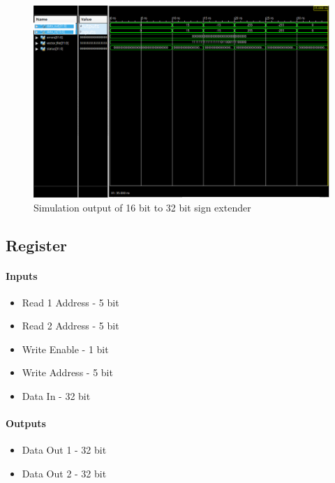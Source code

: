 \documentclass{article}
\begin{document}
    \begin{figure}[H]
        \centering
        \includegraphics[width=0.9\paperwidth,center]{Screenshots/sign_extend.png}
        \caption{Simulation output of 16 bit to 32 bit sign extender}
    \end{figure}




    \subsection{Register}

    \paragraph{Inputs}
    \begin{itemize}
        \item Read 1 Address - 5 bit
        \item Read 2 Address - 5 bit
        \item Write Enable - 1 bit
        \item Write Address - 5 bit
        \item Data In - 32 bit
    \end{itemize}

    \paragraph{Outputs}
    \begin{itemize}
        \item Data Out 1 - 32 bit
        \item Data Out 2 - 32 bit
    \end{itemize}
\end{document}
